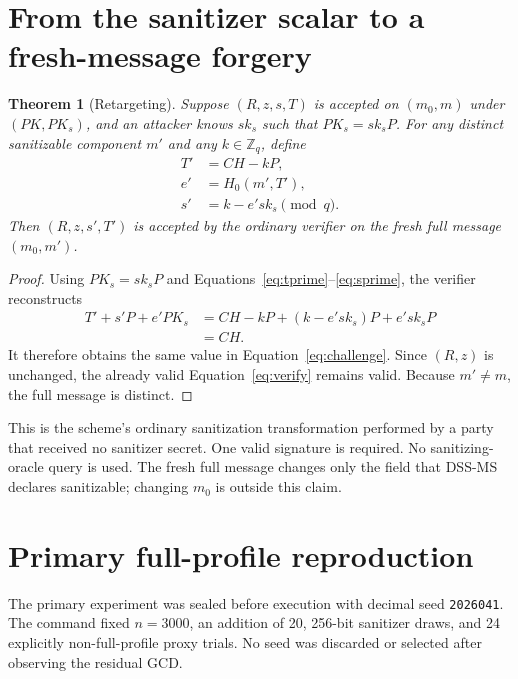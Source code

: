 \documentclass[10pt,a4paper]{article}
\newtheorem{theorem}{Theorem}
\newcommand{\Zq}{\mathbb{Z}_q}
\begin{document}
\section{From the sanitizer scalar to a fresh-message forgery}

\begin{theorem}[Retargeting]
Suppose \((R,z,s,T)\) is accepted on \((m_0,m)\) under
\((PK,PK_s)\), and an attacker knows \(sk_s\) such that
\(PK_s=sk_sP\). For any distinct sanitizable component \(m'\) and any
\(k\in\Zq\), define
\begin{align}
  T' &= CH-kP,                                        \label{eq:tprime}\\
  e' &= H_0(m',T'), \\
  s' &= k-e'sk_s\pmod q.                             \label{eq:sprime}
\end{align}
Then \((R,z,s',T')\) is accepted by the ordinary verifier on the fresh full
message \((m_0,m')\).
\end{theorem}

\begin{proof}
Using \(PK_s=sk_sP\) and Equations~\eqref{eq:tprime}--\eqref{eq:sprime}, the
verifier reconstructs
\begin{align*}
  T'+s'P+e'PK_s
  &= CH-kP+(k-e'sk_s)P+e'sk_sP\\
  &= CH.
\end{align*}
It therefore obtains the same value in Equation~\eqref{eq:challenge}. Since
\((R,z)\) is unchanged, the already valid Equation~\eqref{eq:verify} remains
valid. Because \(m'\ne m\), the full message is distinct.
\end{proof}

This is the scheme's ordinary sanitization transformation performed by a
party that received no sanitizer secret. One valid signature is required. No
sanitizing-oracle query is used. The fresh full message changes only the field
that DSS-MS declares sanitizable; changing \(m_0\) is outside this claim.

\section{Primary full-profile reproduction}

The primary experiment was sealed before execution with decimal seed
\texttt{2026041}. The command fixed \(n=3000\), an addition of 20, 256-bit
sanitizer draws, and 24 explicitly non-full-profile proxy trials. No seed was
discarded or selected after observing the residual GCD.
\end{document}
